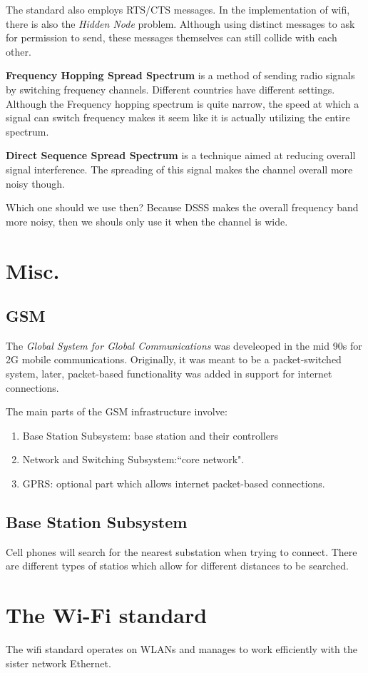 \documentclass{article}
\begin{document}
The standard also employs RTS/CTS messages. In the implementation of wifi, there is also the \textit{Hidden Node} problem.
Although using distinct messages to ask for permission to send, these messages themselves can still collide with each other.

\textbf{Frequency Hopping Spread Spectrum} is a method of sending radio signals by switching frequency channels. Different
countries have different settings. Although the Frequency hopping spectrum is quite narrow, the speed at which a signal
can switch frequency makes it seem like it is actually utilizing the entire spectrum.

\textbf{Direct Sequence Spread Spectrum} is a technique aimed at reducing overall signal interference. The spreading of this
signal makes the channel overall more noisy though.

Which one should we use then? 
Because DSSS makes the overall frequency band more noisy, then we shouls only use it when the channel is wide.
\section{Misc.}
\subsection{GSM}
The \textit{Global System for Global Communications} was develeoped in the mid 90s for 2G mobile communications. Originally,
it was meant to be a packet-switched system, later, packet-based functionality was added in support for internet connections.

The  main parts of the GSM infrastructure involve:
\begin{enumerate}
		\item{Base Station Subsystem}: base station and their controllers
		\item{Network and Switching Subsystem}:``core network".
		\item{GPRS}: optional part which allows internet packet-based connections.

				
\end{enumerate}
\subsection{Base Station Subsystem} 
Cell phones will search for the nearest substation when trying to connect. There are different types of statios which allow
for different distances to be searched.
\section{The Wi-Fi standard}
The wifi standard operates on WLANs and manages to work efficiently with the sister network Ethernet.
\end{document}

